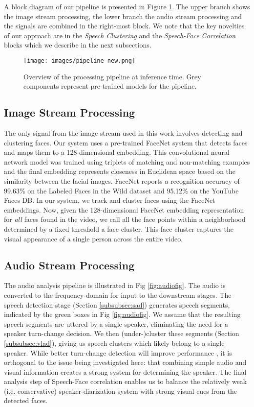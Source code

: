 \documentclass[a4paper]{article}
\begin{document}
A block diagram of our pipeline is presented in Figure \ref{fig:pipeline}. The upper branch shows the image stream processing, the lower branch the audio stream processing and the signals are combined in the right-most block. We note that the key novelties of our approach are in the {\it Speech Clustering} and the {\it Speech-Face Correlation} blocks which we describe in the next subsections. 

\begin{figure}[t]
  \texttt{[image: images/pipeline-new.png]}
  \caption{Overview of the processing pipeline at inference time. Grey components represent pre-trained models for the pipeline.}
  \label{fig:pipeline}
\end{figure}

\subsection{Image Stream Processing}
\label{subsec:imageprocessing}
The only signal from the image stream used in this work involves detecting and clustering faces. Our system uses a pre-trained FaceNet system \cite{Sch15} that detects faces and maps them to a 128-dimensional embedding. This convolutional neural network model was trained using triplets of matching and non-matching examples and the final embedding represents closeness in Euclidean space based on the similarity between the facial images. FaceNet reports a recognition accuracy of 99.63\% on the Labeled Faces in the Wild dataset and 95.12\% on the YouTube Faces DB. In our system, we track and cluster faces using the FaceNet embeddings. Now, given the 128-dimensional FaceNet embedding representation for {\it all} faces found in the video, we call all the face points within a neighborhood determined by a fixed threshold a face cluster. This face cluster captures the visual appearance of a single person across the entire video.

\subsection{Audio Stream Processing}
\label{subsec:audioprocessing}

The audio analysis pipeline is illustrated in Fig \ref{fig:audiofig}. The audio is converted to the frequency-domain for input to the downstream stages. The speech detection stage (Section \ref{subsubsec:sad}) generates speech segments, indicated by the green boxes in Fig \ref{fig:audiofig}. We assume that the resulting speech segments are uttered by a single speaker, eliminating the need for a speaker turn-change decision. We then (under-)cluster these segments (Section \ref{subsubsec:vlad}), giving us speech clusters which likely belong to a single speaker. While better turn-change detection will improve performance \cite{Shu13}, it is orthogonal to the issue being investigated here: that combining simple audio and visual information creates a strong system for determining the speaker. The final analysis step of Speech-Face correlation enables us to balance the relatively weak (i.e. conservative) speaker-diarization system with strong visual cues from the detected faces.
\end{document}
